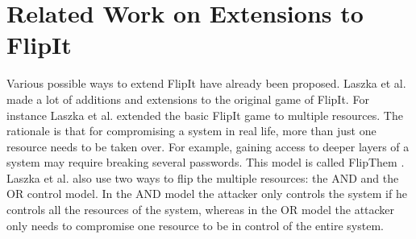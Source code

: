 
\section{Related Work on Extensions to FlipIt}
\label{ch1:extendedWork}

Various possible ways to extend FlipIt have already been proposed. 
Laszka et al. made a lot of additions and extensions to the original game of FlipIt. For instance Laszka et al. extended the basic FlipIt game to multiple resources. The rationale is that for compromising a system in real life, more than just one resource needs to be taken over. For example, gaining access to deeper layers of a system may require breaking several passwords. This model is called FlipThem \cite{FlipThem}. Laszka et al. also use two ways to flip the multiple resources: the AND and the OR control model. In the AND model the attacker only controls the system if he controls all the resources of the system, whereas in the OR model the attacker only needs to compromise one resource to be in control of the entire system. \\

